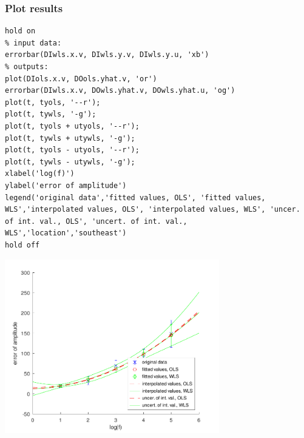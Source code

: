 {}
\subsubsection*{Plot results}

\begin{lstlisting}
hold on
% input data:
errorbar(DIwls.x.v, DIwls.y.v, DIwls.y.u, 'xb')
% outputs:
plot(DIols.x.v, DOols.yhat.v, 'or')
errorbar(DIwls.x.v, DOwls.yhat.v, DOwls.yhat.u, 'og')
plot(t, tyols, '--r');
plot(t, tywls, '-g');
plot(t, tyols + utyols, '--r');
plot(t, tywls + utywls, '-g');
plot(t, tyols - utyols, '--r');
plot(t, tywls - utywls, '-g');
xlabel('log(f)')
ylabel('error of amplitude')
legend('original data','fitted values, OLS', 'fitted values, WLS','interpolated values, OLS', 'interpolated values, WLS', 'uncer. of int. val., OLS', 'uncert. of int. val., WLS','location','southeast')
hold off
\end{lstlisting}
\begin{center}
\includegraphics[width=0.7\textwidth]{algs_examples_published/wlsfit_alg_example-1.pdf}
\end{center}


\stopcontents[localtoc]
